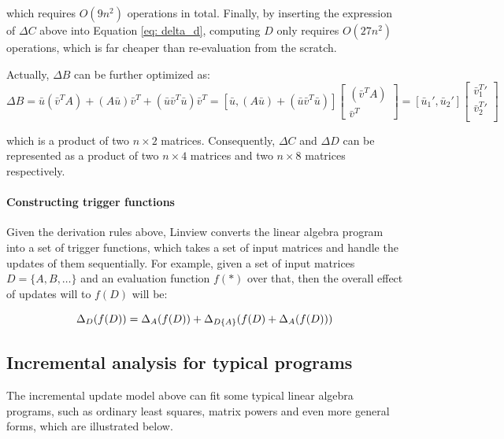which requires $O(9n^2)$ operations in total. Finally, by inserting the expression of $\Delta C$ above into Equation \ref{eq: delta_d}, computing $D$ only requires $O(27n^2)$ operations, which is far cheaper than re-evaluation from the scratch.

Actually, $\Delta B$ can be further optimized as:
\begin{equation}\label{eq: update_b_product_opt}
\Delta B = \bar{u}(\bar{v}^TA) + (A\bar{u})\bar{v}^T + (\bar{u}\bar{v}^T\bar{u})\bar{v}^T=[\bar{u}, (A\bar{u}) + (\bar{u}\bar{v}^T\bar{u})]
\begin{bmatrix}
    (\bar{v}^TA)  \\
    \bar{v}^T 
\end{bmatrix}
=[\bar{u}_1', \bar{u}_2']
\begin{bmatrix}
    \bar{v}^T_1'  \\
    \bar{v}^T_2'  \\
\end{bmatrix}
\end{equation}

which is a product of two $n \times 2$ matrices. Consequently, $\Delta C$ and $\Delta D$ can be represented as a product of two $n \times 4$ matrices and two $n \times 8$ matrices respectively.

\paragraph{Constructing trigger functions}
Given the derivation rules above, Linview converts the linear algebra program into a set of trigger functions, which takes a set of input matrices and handle the updates of them sequentially. For example, given a set of input matrices $D=\{A, B, \dots\}$ and an evaluation function $f(*)$ over that, then the overall effect of updates will to $f(D)$ will be:

\begin{equation}\label{eq: updates_by_multi_vars}
\Delta_{D}(f(D)) = \Delta_{A}(f(D)) + \Delta_{D\\\{A\}}(f(D) + \Delta_{A}(f(D)))
\end{equation}



\subsection{Incremental analysis for typical programs}
The incremental update model above can fit some typical linear algebra programs, such as ordinary least squares, matrix powers and even more general forms, which are illustrated below.

